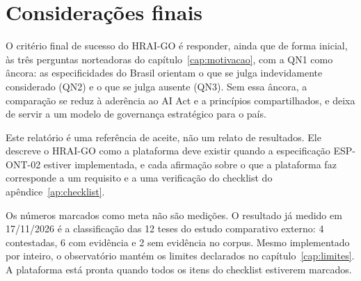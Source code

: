 \documentclass[12pt,a4paper,oneside,english,brazil]{abntex2}
\begin{document}
\chapter{Considerações finais}

O critério final de sucesso do HRAI-GO é responder, ainda que de forma inicial, às três perguntas norteadoras do capítulo~\ref{cap:motivacao}, com a QN1 como âncora: as especificidades do Brasil orientam o que se julga indevidamente considerado (QN2) e o que se julga ausente (QN3). Sem essa âncora, a comparação se reduz à aderência ao AI Act e a princípios compartilhados, e deixa de servir a um modelo de governança estratégico para o país.

Este relatório é uma referência de aceite, não um relato de resultados. Ele descreve o HRAI-GO como a plataforma deve existir quando a especificação ESP-ONT-02 estiver implementada, e cada afirmação sobre o que a plataforma faz corresponde a um requisito e a uma verificação do checklist do apêndice~\ref{ap:checklist}.

Os números marcados como meta não são medições. O resultado já medido em 17/11/2026 é a classificação das 12 teses do estudo comparativo externo: 4 contestadas, 6 com evidência e 2 sem evidência no corpus. Mesmo implementado por inteiro, o observatório mantém os limites declarados no capítulo~\ref{cap:limites}. A plataforma está pronta quando todos os itens do checklist estiverem marcados.

\postextual

\end{document}
